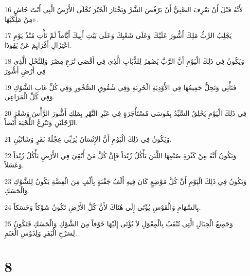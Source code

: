 \par 16 لأَنَّهُ قَبْلَ أَنْ يَعْرِفَ الصَّبِيُّ أَنْ يَرْفُضَ الشَّرَّ وَيَخْتَارَ الْخَيْرَ تُخْلَى الأَرْضُ الَّتِي أَنْتَ خَاشٍ مِنْ مَلِكَيْهَا».
\par 17 يَجْلِبُ الرَّبُّ مَلِكَ أَشُّورَ عَلَيْكَ وَعَلَى شَعْبِكَ وَعَلَى بَيْتِ أَبِيكَ أَيَّاماً لَمْ تَأْتِ مُنْذُ يَوْمِ اعْتِزَالِ أَفْرَايِمَ عَنْ يَهُوذَا.
\par 18 وَيَكُونُ فِي ذَلِكَ الْيَوْمِ أَنَّ الرَّبَّ يَصْفِرُ لِلذُّبَابِ الَّذِي فِي أَقْصَى تُرَعِ مِصْرَ وَلِلنَّحْلِ الَّذِي فِي أَرْضِ أَشُّورَ
\par 19 فَتَأْتِي وَتَحِلُّ جَمِيعُهَا فِي الأَوْدِيَةِ الْخَرِبَةِ وَفِي شُقُوقِ الصُّخُورِ وَفِي كُلِّ غَابِ الشَّوْكِ وَفِي كُلِّ الْمَرَاعِي.
\par 20 فِي ذَلِكَ الْيَوْمِ يَحْلِقُ السَّيِّدُ بِمُوسَى مُسْتَأْجَرَةٍ فِي عَبْرِ النَّهْرِ بِمَلِكِ أَشُّورَ الرَّأْسَ وَشَعْرَ الرِّجْلَيْنِ وَتَنْزِعُ اللِّحْيَةَ أَيْضاً.
\par 21 وَيَكُونُ فِي ذَلِكَ الْيَوْمِ أَنَّ الإِنْسَانَ يُرَبِّي عِجْلَةَ بَقَرٍ وَشَاتَيْنِ.
\par 22 وَيَكُونُ أَنَّهُ مِنْ كَثْرَةِ صُنْعِهَا اللَّبَنَ يَأْكُلُ زُبْداً فَإِنَّ كُلَّ مَنْ أُبْقِيَ فِي الأَرْضِ يَأْكُلُ زُبْداً وَعَسَلاً.
\par 23 وَيَكُونُ فِي ذَلِكَ الْيَوْمِ أَنَّ كُلَّ مَوْضِعٍ كَانَ فِيهِ أَلْفُ جَفْنَةٍ بِأَلْفٍ مِنَ الْفِضَّةِ يَكُونُ لِلشَّوْكِ وَالْحَسَكِ.
\par 24 بِالسِّهَامِ وَالْقَوْسِ يُؤْتَى إِلَى هُنَاكَ لأَنَّ كُلَّ الأَرْضِ تَكُونُ شَوْكاً وَحَسَكاً.
\par 25 وَجَمِيعُ الْجِبَالِ الَّتِي تُنْقَبُ بِالْمِعْوَلِ لاَ يُؤْتَى إِلَيْهَا خَوْفاً مِنَ الشَّوْكِ وَالْحَسَكِ فَتَكُونُ لِسَرْحِ الْبَقَرِ وَلِدَوْسِ الْغَنَمِ.

\chapter{8}

